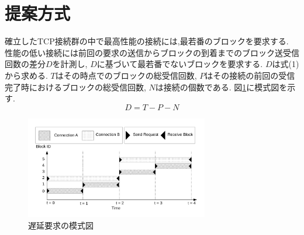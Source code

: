 \documentclass{ltjsarticle}
\begin{document}
\section{提案方式}
\vspace{-2mm}
確立したTCP接続群の中で最高性能の接続には,最若番のブロックを要求する.
性能の低い接続には前回の要求の送信からブロックの到着までのブロック送受信回数の差分\begin{math}D\end{math}を計測し,
\begin{math}D\end{math}に基づいて最若番でないブロックを要求する.
\begin{math}D\end{math}は式(1)から求める.
\begin{math}T\end{math}はその時点でのブロックの総受信回数,
\begin{math}P\end{math}はその接続の前回の受信完了時におけるブロックの総受信回数,
\begin{math}N\end{math}は接続の個数である.
図\ref{delay}に模式図を示す.
\label{eq}
\begin{equation}
	D = T - P - N
\end{equation}
\vspace{-10mm}
\begin{figure}[h]
	\centering
	\includegraphics[width=8cm]{figure/delay.pdf}
	\caption{遅延要求の模式図}
	\label{delay}
\end{figure}
\vspace{-10mm}
\end{document}
